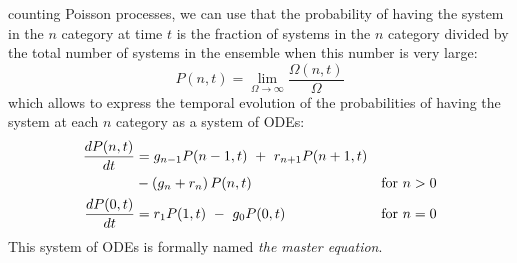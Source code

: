 counting Poisson processes, we can use that the probability of having the system in the $n$ category at time $t$ is the fraction of systems in the $n$ category divided by the total number of systems in the ensemble when this number is very large:
\begin{equation}
P(n, t) = \lim_{\Omega \rightarrow \infty} \frac{\Omega(n,t)}{\Omega} 
\end{equation}
which allows to express the temporal evolution of the probabilities of having the system at each $n$ category as a system of ODEs:
\begin{align}
\frac{dP(n,t)}{dt} &=    g_{n-1} P(n-1,t) \,\, + \,\, r_{n+1} P(n+1,t) &                 \nonumber \\
                   &    - (g_n + r_n )\,P(n,t)              & \textup{for} \,\, n > 0    \nonumber \\
\frac{dP(0,t)}{dt} &=  r_1 P(1,t) \,\, - \,\, g_0 P(0,t)    & \textup{for} \,\, n=0 \label{me_1}
\end{align}
This system of ODEs is formally named {\em the master equation}. 

